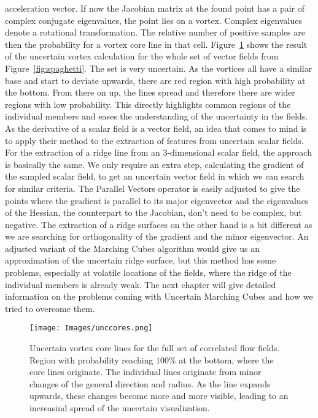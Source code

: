 acceleration vector. If now the Jacobian matrix at the found point has a
pair of complex conjugate eigenvalues, the point lies on a vortex.
Complex eigenvalues denote a rotational transformation. The relative
number of positive samples are then the probability for a vortex core
line in that cell. Figure~\ref{fig:UVC} shows the result of the
uncertain vortex calculation for the whole set of vector fields from
Figure~\ref{fig:spaghetti}. The set is very uncertain. As the vortices
all have a similar base and start to deviate upwards, there are red
region with high probability at the bottom. From there on up, the lines
spread and therefore there are wider regions with low probability. This
directly highlights common regions of the individual members and eases
the understanding of the uncertainty in the fields.\\
\indent As the derivative of a scalar field is a vector field, an idea
that comes to mind is to apply their method to the extraction of
features from uncertain scalar fields. For the extraction of a ridge
line from an 3-dimensional scalar field, the approach is basically the
same. We only require an extra step, calculating the gradient of the
sampled scalar field, to get an uncertain vector field in which we can
search for similar criteria. The Parallel Vectors operator is easily
adjusted to give the points where the gradient is parallel to its major
eigenvector and the eigenvalues of the Hessian, the counterpart to the
Jacobian, don't need to be complex, but negative. The extraction of a
ridge surfaces on the other hand is a bit different as we are searching
for orthogonality of the gradient and the minor eigenvector. An adjusted
variant of the Marching Cubes algorithm would give us an approximation
of the uncertain ridge surface, but this method has some problems,
especially at volatile locations of the fields, where the ridge of the
individual members is already weak. The next chapter will give detailed
information on the problems coming with Uncertain Marching Cubes and how
we tried to overcome them.

\begin{figure}[t]
    \centering
    \texttt{[image: Images/unccores.png]}
    \caption{Uncertain vortex core lines for the full set of correlated
    flow fields. Region with probability reaching $100\%$ at the bottom,
    where the core lines originate. The individual lines originate from
    minor changes of the general direction and radius. As the line expands
    upwards, these changes become more and more visible, leading to an
    increasind spread of the uncertain visualization.}
    \label{fig:UVC}
\end{figure}